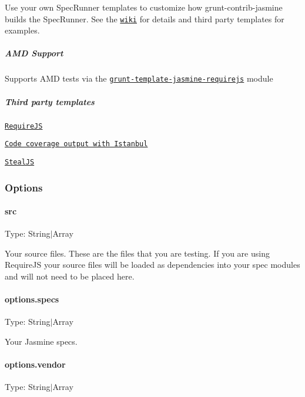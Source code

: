 Use your own Spec\+Runner templates to customize how {\ttfamily grunt-\/contrib-\/jasmine} builds the Spec\+Runner. See the \href{https://github.com/gruntjs/grunt-contrib-jasmine/wiki/Jasmine-Templates}{\tt wiki} for details and third party templates for examples.

\subparagraph*{A\+M\+D Support}

Supports A\+M\+D tests via the \href{https://github.com/jsoverson/grunt-template-jasmine-requirejs}{\tt grunt-\/template-\/jasmine-\/requirejs} module

\subparagraph*{Third party templates}


\begin{DoxyItemize}
\item \href{https://github.com/jsoverson/grunt-template-jasmine-requirejs}{\tt Require\+J\+S}
\item \href{https://github.com/maenu/grunt-template-jasmine-istanbul}{\tt Code coverage output with Istanbul}
\item \href{https://github.com/jaredstehler/grunt-template-jasmine-steal}{\tt Steal\+J\+S}
\end{DoxyItemize}

\subsubsection*{Options}

\paragraph*{src}

Type\+: {\ttfamily String$\vert$\+Array}

Your source files. These are the files that you are testing. If you are using Require\+J\+S your source files will be loaded as dependencies into your spec modules and will not need to be placed here.

\paragraph*{options.\+specs}

Type\+: {\ttfamily String$\vert$\+Array}

Your Jasmine specs.

\paragraph*{options.\+vendor}

Type\+: {\ttfamily String$\vert$\+Array}

